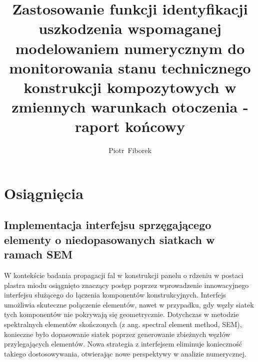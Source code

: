 \documentclass[a4paper,11pt]{article}
\author{Piotr~Fiborek}
\title{Zastosowanie funkcji identyfikacji uszkodzenia wspomaganej modelowaniem numerycznym do monitorowania stanu technicznego konstrukcji kompozytowych w zmiennych warunkach otoczenia - raport końcowy}
\date{}
\begin{document}




\section{Osiągnięcia}
\subsection{Implementacja interfejsu sprzęgającego elementy o niedopasowanych siatkach w ramach SEM}
W kontekście badania propagacji fal w konstrukcji panelu o rdzeniu w postaci plastra miodu osiągnięto znaczący postęp poprzez wprowadzenie innowacyjnego interfejsu służącego do łączenia komponentów konstrukcyjnych. Interfejs umożliwia skuteczne połączenie elementów, nawet w przypadku, gdy węzły siatek tych komponentów nie pokrywają się geometrycznie. Dotychczas w metodzie spektralnych elementów skończonych (z ang. spectral element method, SEM), konieczne było dopasowanie siatek poprzez generowanie zbieżnych węzłów przylegających elementów. Nowa strategia z interfejsem eliminuje konieczność takiego dostosowywania, otwierając nowe perspektywy w analizie numerycznej.
\end{document}
